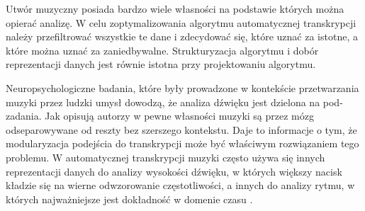 \documentclass[12pt,a4paper,twoside]{mwart}
\begin{document}
Utwór muzyczny posiada bardzo wiele własności na podstawie których można opierać analizę. W celu zoptymalizowania algorytmu automatycznej transkrypcji należy przefiltrować wszystkie te dane i zdecydować się, które uznać za istotne, a które można uznać za zaniedbywalne. Strukturyzacja algorytmu i dobór reprezentacji danych jest równie istotna przy projektowaniu algorytmu.

Neuropsychologiczne badania, które były prowadzone w kontekście przetwarzania muzyki przez ludzki umysł dowodzą, że analiza dźwięku jest dzielona na pod-zadania. Jak opisują autorzy w \cite{Transcription:Zatorre:AuditoryCortex} pewne własności muzyki są przez mózg odseparowywane od reszty bez szerszego kontekstu. Daje to informacje o tym, że modularyzacja podejścia do transkrypcji może być właściwym rozwiązaniem tego problemu. W automatycznej transkrypcji muzyki często używa się innych reprezentacji danych do analizy wysokości dźwięku, w których większy nacisk kładzie się na wierne odwzorowanie częstotliwości, a innych do analizy rytmu, w których najważniejsze jest dokładność w domenie czasu 
\cite[11-13]{Transcription:Anssi:SignalProcessingMethods}
.
\end{document}
